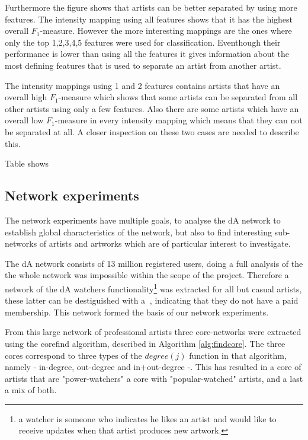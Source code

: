 Furthermore the figure shows that artists can be better separated by using more features.
The intensity mapping using all features shows that it has the highest overall $F_1$-measure.
However the more interesting mappings are the ones where only the top 1,2,3,4,5 features were used for classification.
Eventhough their performance is lower than using all the features it gives information about the most defining features that is used to separate an artist from another artist.

The intensity mappings using 1 and 2 features contains artists that have an overall high $F_1$-measure which shows that some artists can be separated from all other artists using only a few features.
Also there are some artists which have an overall low $F_1$-measure in every intensity mapping which means that they can not be separated at all.
A closer inspection on these two cases are needed to describe this.

Table shows 

\subsection{Network experiments}
The network experiments have multiple goals, to analyse the dA network to establish global characteristics of the network, but also to find interesting sub-networks of artists and artworks which are of particular interest to investigate.

The dA network consists of 13 million registered users, doing a full analysis of the the whole network was impossible within the scope of the project. Therefore a network of the dA watchers functionality\footnote{a watcher is someone who indicates he likes an artist and would like to receive updates when that artist produces new artwork.} was extracted for all but casual artists, these latter can be destiguished with a $~$, indicating that they do not have a paid membership. This network formed the basis of our network experiments.

From this large network of professional artists three core-networks were extracted using the corefind algorithm, described in Algorithm \ref{alg:findcore}. The three cores correspond to three types of the $degree(j)$ function in that algorithm, namely - in-degree, out-degree and in+out-degree -. This has resulted in a core of artists that are "power-watchers" a core with "popular-watched" artists, and a last a mix of both.

